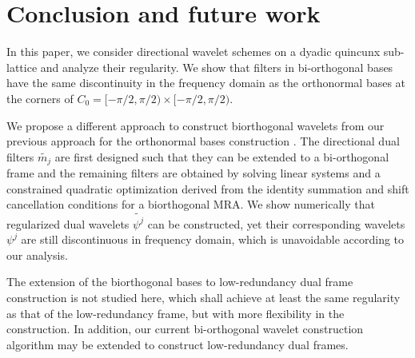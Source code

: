 \section{Conclusion and future work}\label{sec: end}
In this paper, we consider directional wavelet schemes on a dyadic quincunx sub-lattice and analyze their regularity. We show that filters in bi-orthogonal bases have the same discontinuity in the frequency domain as the orthonormal bases at the corners of $C_0 = [-\pi/2,\pi/2)\times[-\pi/2,\pi/2)$. 

 We propose a different approach to construct biorthogonal wavelets from our previous approach for the orthonormal bases construction \cite{yin2014orthshear}. The directional dual filters $\widetilde{m_j}$ are first designed such that they can be extended to a bi-orthogonal frame and the remaining filters are obtained by solving linear systems and a constrained quadratic optimization derived from the identity summation and shift cancellation conditions for a biorthogonal MRA. We show numerically that regularized dual wavelets $\widetilde{\psi^j}$ can be constructed, yet their corresponding wavelets $\psi^j$ are still discontinuous in frequency domain, which is unavoidable according to our analysis.

The extension of the biorthogonal bases to low-redundancy dual frame construction is not studied here, which shall achieve at least the same regularity as that of the low-redundancy frame, but with more flexibility in the construction. In addition, our current bi-orthogonal wavelet construction algorithm may be extended to construct low-redundancy dual frames.